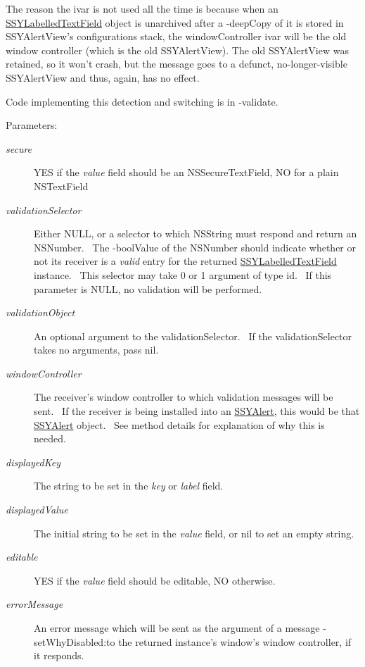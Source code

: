 The reason the ivar is not used all the time is because when an \hyperlink{interface_s_s_y_labelled_text_field}{SSYLabelledTextField} object is unarchived after a -deepCopy of it is stored in SSYAlertView's configurations stack, the windowController ivar will be the old window controller (which is the old SSYAlertView). The old SSYAlertView was retained, so it won't crash, but the message goes to a defunct, no-longer-visible SSYAlertView and thus, again, has no effect.

Code implementing this detection and switching is in -validate.

\begin{Desc}
\item[Parameters:]
\begin{description}
\item[{\em secure}]YES if the {\em value\/} field should be an NSSecureTextField, NO for a plain NSTextField \item[{\em validationSelector}]Either NULL, or a selector to which NSString must respond and return an NSNumber.~ The -boolValue of the NSNumber should indicate whether or not its receiver is a {\em valid\/} entry for the returned \hyperlink{interface_s_s_y_labelled_text_field}{SSYLabelledTextField} instance.~ This selector may take 0 or 1 argument of type id.~ If this parameter is NULL, no validation will be performed. \item[{\em validationObject}]An optional argument to the validationSelector.~ If the validationSelector takes no arguments, pass nil. \item[{\em windowController}]The receiver's window controller to which validation messages will be sent.~ If the receiver is being installed into an \hyperlink{interface_s_s_y_alert}{SSYAlert}, this would be that \hyperlink{interface_s_s_y_alert}{SSYAlert} object.~ See method details for explanation of why this is needed. \item[{\em displayedKey}]The string to be set in the {\em key\/} or {\em label\/} field. \item[{\em displayedValue}]The initial string to be set in the {\em value\/} field, or nil to set an empty string. \item[{\em editable}]YES if the {\em value\/} field should be editable, NO otherwise. \item[{\em errorMessage}]An error message which will be sent as the argument of a message -setWhyDisabled:to the returned instance's window's window controller, if it responds. \end{description}
\end{Desc}

